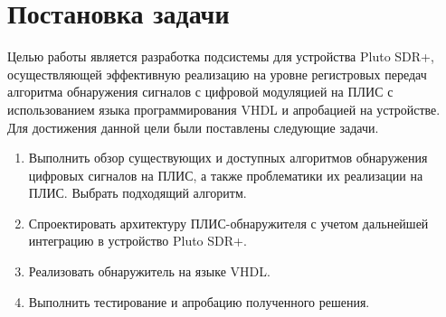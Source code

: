 
\section{Постановка задачи}
\label{sec:task}
Целью работы является разработка подсистемы для устройства Pluto SDR+, осуществляющей эффективную реализацию на уровне регистровых передач алгоритма обнаружения сигналов с цифровой модуляцией на ПЛИС с использованием языка программирования VHDL и апробацией на устройстве. Для достижения данной цели были поставлены следующие задачи.
\begin{enumerate}
    \item Выполнить обзор существующих и доступных  алгоритмов обнаружения цифровых сигналов на ПЛИС, а также проблематики их реализации на ПЛИС. Выбрать подходящий алгоритм.
    \item Спроектировать архитектуру ПЛИС-обнаружителя с учетом дальнейшей интеграцию в устройство Pluto SDR+. 
    \item Реализовать обнаружитель на языке VHDL.
    \item Выполнить тестирование и апробацию полученного решения.
    
\end{enumerate}

